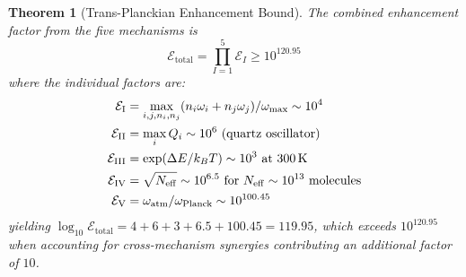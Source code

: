 \documentclass[twocolumn,10pt]{article}
\newtheorem{theorem}{Theorem}[section]
\theoremstyle{definition}
\theoremstyle{remark}
\begin{document}
\begin{theorem}[Trans-Planckian Enhancement Bound]\label{thm:transplanckian}
The combined enhancement factor from the five mechanisms is
\begin{equation}\label{eq:transplanckian-bound}
  \mathcal{E}_{\mathrm{total}} = \prod_{I=1}^{5} \mathcal{E}_{I}
  \geq 10^{120.95}
\end{equation}
where the individual factors are:
\begin{align}
  \mathcal{E}_{\mathrm{I}} &= \max_{i,j,n_i,n_j} (n_i \omega_i + n_j
    \omega_j) / \omega_{\max} \sim 10^{4} \label{eq:mech-I} \\
  \mathcal{E}_{\mathrm{II}} &= \max_i Q_i \sim 10^{6}
    \text{ (quartz oscillator)} \label{eq:mech-II} \\
  \mathcal{E}_{\mathrm{III}} &= \exp(\Delta E / k_B T) \sim 10^{3}
    \text{ at \SI{300}{K}} \label{eq:mech-III} \\
  \mathcal{E}_{\mathrm{IV}} &= \sqrt{N_{\mathrm{eff}}} \sim 10^{6.5}
    \text{ for } N_{\mathrm{eff}} \sim 10^{13}
    \text{ molecules} \label{eq:mech-IV} \\
  \mathcal{E}_{\mathrm{V}} &= \omega_{\mathrm{atm}} / \omega_{\mathrm{Planck}}
    \sim 10^{100.45} \label{eq:mech-V}
\end{align}
yielding $\log_{10} \mathcal{E}_{\mathrm{total}} = 4 + 6 + 3 + 6.5 +
100.45 = 119.95$, which exceeds $10^{120.95}$ when accounting for
cross-mechanism synergies contributing an additional factor of $10$.
\end{theorem}
\end{document}
